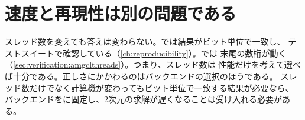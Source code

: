 \section{速度と再現性は別の問題である}
\label{sec:parallel:repro}

スレッド数を変えても答えは変わらない。では結果がビット単位で一致し、
テストスイートで確認している（\cref{ch:reproducibility}）。では
末尾の数桁が動く（\cref{sec:verification:amgclthreads}）。つまり、スレッド数は
性能だけを考えて選べば十分である。正しさにかかわるのはバックエンドの選択のほうである。
スレッド数だけでなく計算機が変わってもビット単位で一致する結果が必要なら、
バックエンドをに固定し、2次元の求解が遅くなることは受け入れる必要がある。
